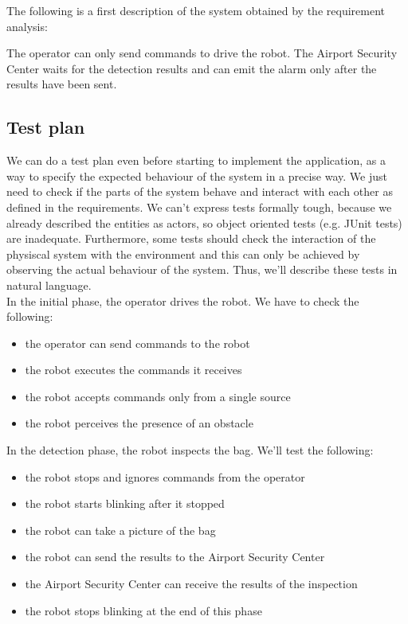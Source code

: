 \documentclass{llncs}
\begin{document}
The following is a first description of the system obtained by the requirement analysis:

The operator can only send commands to drive the robot.
The Airport Security Center waits for the detection results and can emit the alarm only after the results have been sent.

\subsection{Test plan}
We can do a test plan even before starting to implement the application, as a way to specify the expected behaviour of the system in a precise way. We just need to check if the parts of the system behave and interact with each other as defined in the requirements.
We can't express tests formally tough, because we already described the entities as actors, so object oriented tests (e.g. JUnit tests) are inadequate. Furthermore, some tests should check the interaction of the physiscal system with the environment and this can only be achieved by observing the actual behaviour of the system. Thus, we'll describe these tests in natural language.\\
In the initial phase, the operator drives the robot. We have to check the following:
\begin{itemize}
\item the operator can send commands to the robot
\item the robot executes the commands it receives
\item the robot accepts commands only from a single source
\item the robot perceives the presence of an obstacle
\end{itemize}
In the detection phase, the robot inspects the bag. We'll test the following:
\begin{itemize}
\item the robot stops and ignores commands from the operator
\item the robot starts blinking after it stopped
\item the robot can take a picture of the bag
\item the robot can send the results to the Airport Security Center
\item the Airport Security Center can receive the results of the inspection
\item the robot stops blinking at the end of this phase
\end{itemize}
\end{document}
